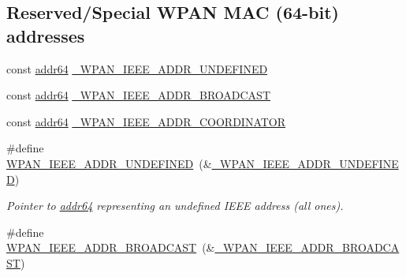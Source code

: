 \subsection*{Reserved/\-Special W\-P\-A\-N M\-A\-C (64-\/bit) addresses}
\begin{DoxyCompactItemize}
\item 
const \hyperlink{unionaddr64}{addr64} \hyperlink{group__wpan__types_gaaa2d876b00a2f300e24f1077e17dcb76}{\-\_\-\-W\-P\-A\-N\-\_\-\-I\-E\-E\-E\-\_\-\-A\-D\-D\-R\-\_\-\-U\-N\-D\-E\-F\-I\-N\-E\-D}
\item 
const \hyperlink{unionaddr64}{addr64} \hyperlink{group__wpan__types_ga83c0da7da25848a435da46b80fb70933}{\-\_\-\-W\-P\-A\-N\-\_\-\-I\-E\-E\-E\-\_\-\-A\-D\-D\-R\-\_\-\-B\-R\-O\-A\-D\-C\-A\-S\-T}
\item 
const \hyperlink{unionaddr64}{addr64} \hyperlink{group__wpan__types_gac6bb0830c58428d2789507a23ab9fcdd}{\-\_\-\-W\-P\-A\-N\-\_\-\-I\-E\-E\-E\-\_\-\-A\-D\-D\-R\-\_\-\-C\-O\-O\-R\-D\-I\-N\-A\-T\-O\-R}
\item 
\#define \hyperlink{group__wpan__types_ga09e965ef6cfbfd48312d86bb011f125b}{W\-P\-A\-N\-\_\-\-I\-E\-E\-E\-\_\-\-A\-D\-D\-R\-\_\-\-U\-N\-D\-E\-F\-I\-N\-E\-D}~(\&\hyperlink{group__wpan__types_gaaa2d876b00a2f300e24f1077e17dcb76}{\-\_\-\-W\-P\-A\-N\-\_\-\-I\-E\-E\-E\-\_\-\-A\-D\-D\-R\-\_\-\-U\-N\-D\-E\-F\-I\-N\-E\-D})
\begin{DoxyCompactList}\small\item\em Pointer to {\ttfamily \hyperlink{unionaddr64}{addr64}} representing an undefined I\-E\-E\-E address (all ones). \end{DoxyCompactList}\item 
\hypertarget{group__wpan__types_gaced36f5538c5bb2da4f60a90313f1674}{\#define \hyperlink{group__wpan__types_gaced36f5538c5bb2da4f60a90313f1674}{W\-P\-A\-N\-\_\-\-I\-E\-E\-E\-\_\-\-A\-D\-D\-R\-\_\-\-B\-R\-O\-A\-D\-C\-A\-S\-T}~(\&\hyperlink{group__wpan__types_ga83c0da7da25848a435da46b80fb70933}{\-\_\-\-W\-P\-A\-N\-\_\-\-I\-E\-E\-E\-\_\-\-A\-D\-D\-R\-\_\-\-B\-R\-O\-A\-D\-C\-A\-S\-T})}\label{group__wpan__types_gaced36f5538c5bb2da4f60a90313f1674}


\end{DoxyCompactItemize}
